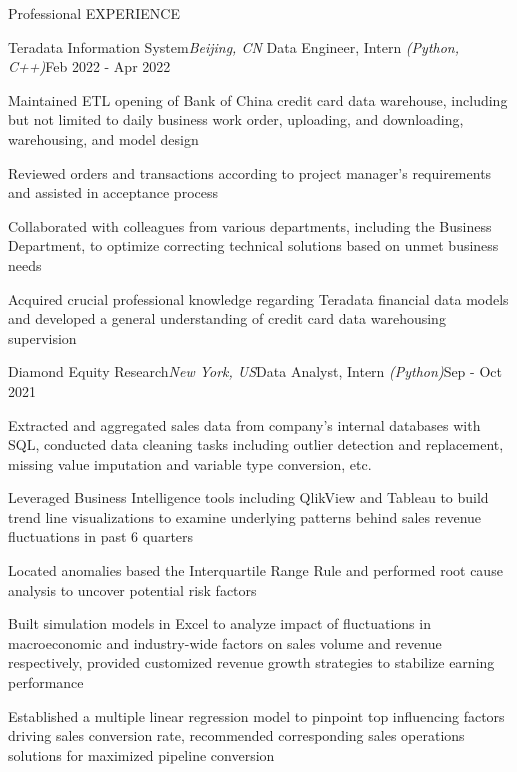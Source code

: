\documentclass{resume} %
\begin{document}
	
\begin{rSection}{Professional EXPERIENCE}
	
	\begin{rSubsection}{Teradata Information System}{\em Beijing, CN}
		{Data Engineer, Intern \emph{(Python, C++)}}{Feb 2022 - Apr 2022}

		\item Maintained ETL opening of Bank of China credit card data warehouse, including but not limited to daily business work order, uploading, and downloading, warehousing, and model design
		\item Reviewed orders and transactions according to project manager's requirements and assisted in acceptance process
		\item Collaborated with colleagues from various departments, including the Business Department, to optimize correcting technical solutions based on unmet business needs
		\item Acquired crucial professional knowledge regarding Teradata financial data models and developed a general understanding of credit card data warehousing supervision
		\vspace{-0.3em}
	\end{rSubsection}
	
	\begin{rSubsection}{Diamond Equity Research}{\em New York, US}{Data Analyst, Intern \emph{(Python)}}{Sep - Oct 2021}
		
	\item Extracted and aggregated sales data from company's internal databases with SQL, conducted data cleaning tasks including outlier detection and replacement, missing value imputation and variable type conversion, etc.
	\item Leveraged Business Intelligence tools including QlikView and Tableau to build trend line visualizations to examine underlying patterns behind sales revenue fluctuations in past 6 quarters
	\item Located anomalies based the Interquartile Range Rule and performed root cause analysis to uncover potential risk factors
	\item Built simulation models in Excel to analyze impact of fluctuations in macroeconomic and industry-wide factors on sales volume and revenue respectively, provided customized revenue growth strategies to stabilize earning performance
	\item Established a multiple linear regression model to pinpoint top influencing factors driving sales conversion rate, recommended corresponding sales operations solutions for maximized pipeline conversion
	\end{rSubsection}
	
	
\end{rSection}
	
\end{document}

